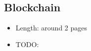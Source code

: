 \subsection{Blockchain}

\begin{itemize}
  \item Length: around 2 pages
  \item TODO:
\end{itemize}
